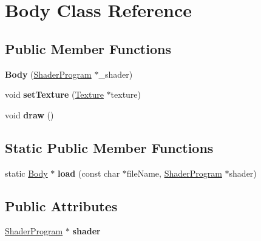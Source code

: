 \hypertarget{class_body}{\section{Body Class Reference}
\label{class_body}
}
\subsection*{Public Member Functions}
\begin{DoxyCompactItemize}
\item 
\hypertarget{class_body_a7e0f14399211b312742ee1a028f23a59}{{\bfseries Body} (\hyperlink{class_shader_program}{Shader\-Program} $\ast$\-\_\-shader)}\label{class_body_a7e0f14399211b312742ee1a028f23a59}

\item 
\hypertarget{class_body_a0356e6b53fb9a5bb3caea58496a1609b}{void {\bfseries set\-Texture} (\hyperlink{class_texture}{Texture} $\ast$texture)}\label{class_body_a0356e6b53fb9a5bb3caea58496a1609b}

\item 
\hypertarget{class_body_a4b36e139d3833e1719f1abe33b388e3c}{void {\bfseries draw} ()}\label{class_body_a4b36e139d3833e1719f1abe33b388e3c}

\end{DoxyCompactItemize}
\subsection*{Static Public Member Functions}
\begin{DoxyCompactItemize}
\item 
\hypertarget{class_body_aad43da455cd7683f61d49655e44d7e27}{static \hyperlink{class_body}{Body} $\ast$ {\bfseries load} (const char $\ast$file\-Name, \hyperlink{class_shader_program}{Shader\-Program} $\ast$shader)}\label{class_body_aad43da455cd7683f61d49655e44d7e27}

\end{DoxyCompactItemize}
\subsection*{Public Attributes}
\begin{DoxyCompactItemize}
\item 
\hypertarget{class_body_a429ea3d1f26cd83c774c621eb1e8e180}{\hyperlink{class_shader_program}{Shader\-Program} $\ast$ {\bfseries shader}}\label{class_body_a429ea3d1f26cd83c774c621eb1e8e180}

\end{DoxyCompactItemize}
